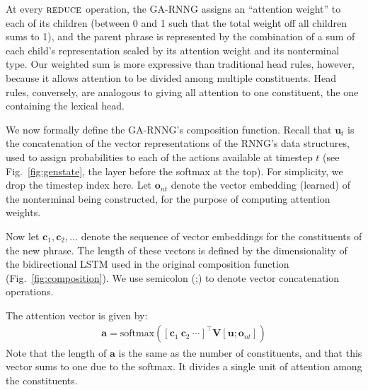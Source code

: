 \documentclass[11pt]{article}
\begin{document}
At every $\textsc{reduce}$ operation, the GA-RNNG assigns an ``attention weight'' to each of its children (between 0 and 1 such that the total weight off all children sums to 1), and the parent phrase is represented by the combination of a sum of each child's representation scaled by its attention weight and its nonterminal type. Our weighted sum is more expressive than traditional head rules, however, because it allows attention to be divided among multiple constituents. Head rules, conversely, are analogous to giving all attention to one constituent, the one containing the lexical head.

We now formally define the GA-RNNG's composition function.
Recall that $\mathbf{u}_t$ is the concatenation of the vector representations of the RNNG's data structures, used to assign probabilities to each of the actions available at timestep $t$ (see Fig.~\ref{fig:genstate}, the layer before the softmax at the top). For simplicity, we drop the timestep index here. Let $\mathbf{o}_{\mathit{nt}}$ denote the vector embedding (learned) of the nonterminal being constructed, for the purpose of computing attention weights. 

Now let $\mathbf{c}_1, \mathbf{c}_2,\ldots$ denote the sequence of vector embeddings for the constituents of the new phrase.  The length of these vectors is defined by the dimensionality of the bidirectional LSTM used in the original composition function (Fig.~\ref{fig:composition}). We use semicolon (;) to denote vector concatenation operations.

The attention vector is given by:
\begin{align}
\mathbf{a} = \mathrm{softmax}\left( \left[ \mathbf{c}_1 \ \mathbf{c}_2 \ \cdots \right]^{\top} \mathbf{V} \left[ \mathbf{u}; \mathbf{o}_{\mathit{nt}} \right]\right)
\end{align}
Note that the length of $\mathbf{a}$ is the same as the number of constituents, and that this vector sums to one due to the softmax.  It divides a single unit of attention among the constituents.

\end{document}
